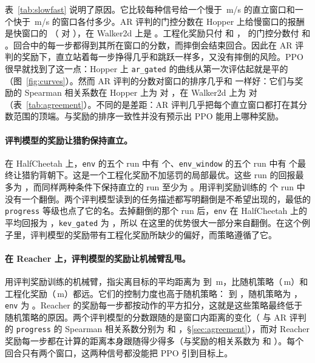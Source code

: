 表~\ref{tab:slowfast} 说明了原因。它比较每种信号给一个慢于 \,m/s 的直立窗口和一个快于 \,m/s 的窗口各付多少。AR 评判的门控分数在 Hopper 上给慢窗口的报酬是快窗口的 （ 对 ），在 Walker2d 上是 。工程化奖励只付  和 ，\kev{} 的门控分数付  和 。回合中的每一步都得到其所在窗口的分数，而摔倒会结束回合。因此在 AR 评判的奖励下，直立站着每一步挣得几乎和跳跃一样多，又没有摔倒的风险。PPO 很早就找到了这一点：Hopper 上 \texttt{ar\_gated} 的曲线从第一次评估起就是平的（图~\ref{fig:curves}）。然而 AR 评判的分数对窗口的排序几乎和 \kev{} 一样好：它们与奖励的 Spearman 相关系数在 Hopper 上为  对 ，在 Walker2d 上为  对 （表~\ref{tab:agreement}）。不同的是差距：AR 评判几乎把每个直立窗口都打在其分数范围的顶端。与奖励的排序一致性并没有预示出 PPO 能用上哪种奖励。

\paragraph{评判模型的奖励让猎豹保持直立。} 在 HalfCheetah 上，\texttt{env} 的五个 run 中有  个、\texttt{env\_window} 的五个 run 中有  个最终让猎豹背朝下。这是一个工程化奖励不加惩罚的局部最优。这些 run 的回报最多为 ，而同样两种条件下保持直立的 run 至少为 。用评判奖励训练的  个 run 中没有一个翻倒。两个评判模型读到的任务描述都写明翻倒是不希望出现的，最低的 \texttt{progress} 等级也点了它的名。去掉翻倒的那个 run 后，\texttt{env} 在 HalfCheetah 上的平均回报为 ，\texttt{kev\_gated} 为 ，所以 \kev{} 在这里的优势很大一部分来自翻倒。在这个例子里，评判模型的奖励带有工程化奖励所缺少的偏好，而策略遵循了它。

\paragraph{在 Reacher 上，评判模型的奖励让机械臂乱甩。} 用评判奖励训练的机械臂，指尖离目标的平均距离为  到 \,m，比随机策略（\,m）和工程化奖励（\,m）都远。它们的控制力度也高于随机策略： 到 ，随机策略为 ，\texttt{env} 为 。Reacher 的奖励每一步都按动作的平方扣分，这就是这些策略最终低于随机策略的原因。两个评判模型的分数跟随的是窗口内距离的变化（\kev{} 与 AR 评判的 \texttt{progress} 的 Spearman 相关系数分别为  和 ，\S\ref{sec:agreement}），而对 Reacher 奖励每一步都在计算的距离本身跟随得少得多（与奖励的相关系数为  和 ）。每个回合只有两个窗口，这两种信号都没能把 PPO 引到目标上。

